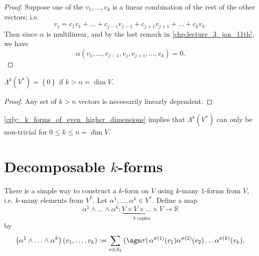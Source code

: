 \documentclass[notoc,notitlepage]{tufte-book}
\begin{document}
\begin{proof}
  Suppose one of the $v_1, \ldots, v_k$ is a linear combination of the rest of the
  other vectors; i.e.
  \begin{equation*}
    v_j = c_1 v_1 + \hdots + c_{j - 1} v_{j - 1} + c_{j + 1} v_{j + 1} + \hdots + c_k v_k.
  \end{equation*}
  Then since $\alpha$ is multilinear, and by the last remark in \cref{chp:lecture_3_jan_11th},
  we have
  \begin{equation*}
    \alpha (v_1, \ldots, v_{j - 1}, v_j , v_{j + 1}, \ldots, v_k) = 0.
  \end{equation*}
\end{proof}

\begin{crly}\label{crly:_k_forms_of_even_higher_dimensions}
  $\Lambda^k \left( V^* \right) = \left\{ 0 \right\}$ if $k > n = \dim V$.
\end{crly}

\begin{proof}
  Any set of $k > n$ vectors is necessarily linearly dependent.
\end{proof}

\begin{note}
  \cref{crly:_k_forms_of_even_higher_dimensions} implies that $\Lambda^k \left( V^* \right)$
  can only be non-trivial for $0 \leq k \leq n = \dim V$.
\end{note}


\section{Decomposable \texorpdfstring{$k$}{k}-forms}%
\label{sec:decomposable_k_forms}

There is a simple way to construct a $k$-form on $V$ using $k$-many $1$-forms from $V$, i.e.
$k$-many elements from $V^*$. Let $\alpha^1, \ldots, \alpha^k \in V^*$. Define a map
\begin{equation*}
  \alpha^1 \land \hdots \land \alpha^k : \underbrace{V \times V \times \hdots
  \times V}_{k \text{ copies }} \to \mathbb{R}
\end{equation*}
by
\begin{equation}\label{eq:defining_a_k_form}
  \left( \alpha^1 \land \hdots \land \alpha^k \right) ( v_1, \ldots, v_k )
  := \sum_{\sigma \in S_k} \left( \sgn \sigma \right) \alpha^{\sigma(1)}(v_1)
  \alpha^{\sigma(2)}(v_2) \hdots \alpha^{\sigma(k)}(v_k).
\end{equation}
\end{document}
